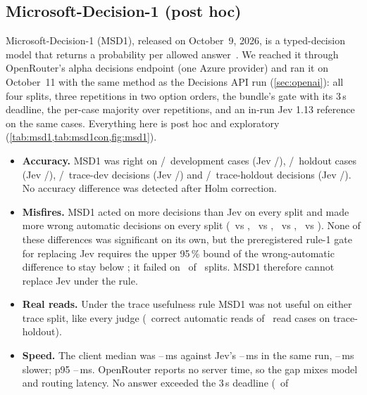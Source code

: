 \subsection{Microsoft-Decision-1 (post hoc)}\label{sec:msd1}
Microsoft-Decision-1 (MSD1), released on October~9, 2026, is a typed-decision model that returns a probability per
allowed answer~\cite{msd1router,msd1foundry}. We reached it through OpenRouter's alpha decisions endpoint (one Azure
provider) and ran it on October~11 with the same method as the Decisions API run (\cref{sec:openai}): all four splits,
three repetitions in two option orders, the bundle's gate with its 3\,s deadline, the per-case majority over
repetitions, and an in-run Jev 1.13 reference on the same cases. Everything here is post hoc and exploratory
(\cref{tab:msd1,tab:msd1con,fig:msd1}).
\begin{itemize}
  \item \textbf{Accuracy.} MSD1 was right on \MsDevMsK/\MsDevMsN\ development cases (Jev \MsDevJevK/\MsDevJevN),
    \MsHoldoutMsK/\MsHoldoutMsN\ holdout cases (Jev \MsHoldoutJevK/\MsHoldoutJevN), \MsTraceDevMsK/\MsTraceDevMsN\
    trace-dev decisions (Jev \MsTraceDevJevK/\MsTraceDevJevN) and \MsTraceHoldoutMsK/\MsTraceHoldoutMsN\ trace-holdout
    decisions (Jev \MsTraceHoldoutJevK/\MsTraceHoldoutJevN). No accuracy difference was detected after Holm correction.
  \item \textbf{Misfires.} MSD1 acted on more decisions than Jev on every split and made more wrong automatic decisions
    on every split (\MsDevMsWa\ vs \MsDevJevWa, \MsHoldoutMsWa\ vs \MsHoldoutJevWa, \MsTraceDevMsWa\ vs \MsTraceDevJevWa,
    \MsTraceHoldoutMsWa\ vs \MsTraceHoldoutJevWa). None of these differences was significant on its own, but the
    preregistered rule-1 gate for replacing Jev requires the upper 95\,\% bound of the wrong-automatic difference to
    stay below \MsNiWa; it failed on \MsGateFailN\ of \MsSplitsN\ splits. MSD1 therefore cannot replace Jev under the
    rule.
  \item \textbf{Real reads.} Under the trace usefulness rule MSD1 was not useful on either trace split, like every judge
    (\MsTraceHoldoutReads\ correct automatic reads of \MsTraceHoldoutReadCases\ read cases on trace-holdout).
  \item \textbf{Speed.} The client median was \MsPfiftyLo--\MsPfiftyHi\,ms against Jev's \MsJevPfiftyLo--\MsJevPfiftyHi\,ms in
    the same run, \MsGapLo--\MsGapHi\,ms slower; p95 \MsPninetyfiveLo--\MsPninetyfiveHi\,ms. OpenRouter reports no server
    time, so the gap mixes model and routing latency. No answer exceeded the 3\,s deadline (\MsOverDeadline\ of

\end{itemize}
